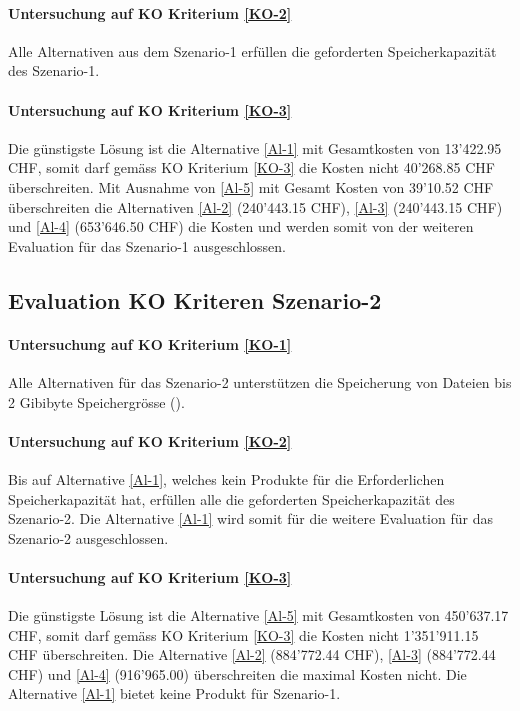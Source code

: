 \paragraph*{Untersuchung auf KO Kriterium \ref{KO-2}}
Alle Alternativen aus dem Szenario-1 erfüllen die geforderten Speicherkapazität des Szenario-1.

\paragraph*{Untersuchung auf KO Kriterium \ref{KO-3}}
Die günstigste Lösung ist die Alternative \ref{Al-1} mit Gesamtkosten von 13'422.95 CHF, somit darf gemäss KO Kriterium \ref{KO-3} die Kosten nicht 40'268.85 CHF überschreiten. Mit Ausnahme von \ref{Al-5} mit Gesamt Kosten von 39'10.52 CHF überschreiten die Alternativen \ref{Al-2} (240’443.15 CHF), \ref{Al-3} (240’443.15 CHF) und \ref{Al-4} (653’646.50 CHF) die Kosten und werden somit von der weiteren Evaluation für das Szenario-1 ausgeschlossen.

\subsection{Evaluation KO Kriteren Szenario-2}

\paragraph*{Untersuchung auf KO Kriterium \ref{KO-1}}
Alle Alternativen für das Szenario-2 unterstützen die Speicherung von Dateien bis 2 Gibibyte Speichergrösse ().

\paragraph*{Untersuchung auf KO Kriterium \ref{KO-2}}
Bis auf Alternative \ref{Al-1}, welches kein Produkte für die Erforderlichen Speicherkapazität hat, erfüllen alle die geforderten Speicherkapazität des Szenario-2. Die Alternative \ref{Al-1} wird somit für die weitere Evaluation für das Szenario-2 ausgeschlossen.

\paragraph*{Untersuchung auf KO Kriterium \ref{KO-3}}
Die günstigste Lösung ist die Alternative  \ref{Al-5}  mit Gesamtkosten von 450'637.17 CHF, somit darf gemäss KO Kriterium \ref{KO-3} die Kosten nicht 1'351'911.15 CHF überschreiten. Die Alternative \ref{Al-2} (884’772.44 CHF), \ref{Al-3} (884’772.44 CHF) und \ref{Al-4} (916’965.00) überschreiten die maximal Kosten nicht. Die Alternative \ref{Al-1} bietet keine Produkt für Szenario-1.

